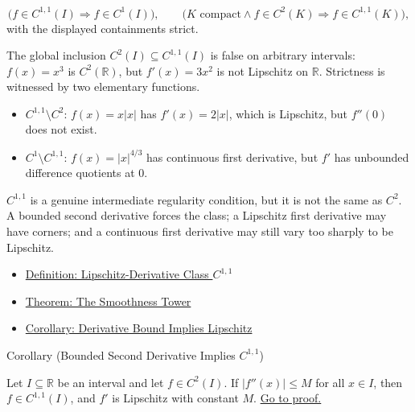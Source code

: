 \begin{remark*}
\[
  \bigl(f\in C^{1,1}(I)\Rightarrow f\in C^1(I)\bigr),
  \qquad
  \bigl(K\text{ compact}\land f\in C^2(K)\Rightarrow f\in C^{1,1}(K)\bigr),
\]
with the displayed containments strict.
\end{remark*}

\begin{remark*}
The global inclusion \(C^2(I)\subseteq C^{1,1}(I)\) is false on arbitrary
intervals: \(f(x)=x^3\) is \(C^2(\mathbb{R})\), but
\(f'(x)=3x^2\) is not Lipschitz on \(\mathbb{R}\). Strictness is witnessed by
two elementary functions.
\begin{itemize}
  \item \(C^{1,1}\setminus C^2\): \(f(x)=x|x|\) has \(f'(x)=2|x|\), which is
        Lipschitz, but \(f''(0)\) does not exist.
  \item \(C^1\setminus C^{1,1}\): \(f(x)=|x|^{4/3}\) has continuous first
        derivative, but \(f'\) has unbounded difference quotients at \(0\).
\end{itemize}
\end{remark*}

\begin{remark*}[Interpretation]
\(C^{1,1}\) is a genuine intermediate regularity condition, but it is not
the same as \(C^2\). A bounded second derivative forces the class; a
Lipschitz first derivative may have corners; and a continuous first
derivative may still vary too sharply to be Lipschitz.
\end{remark*}

\begin{dependencies}
\begin{itemize}
  \item \hyperref[def:class-c11]{Definition: Lipschitz-Derivative Class \(C^{1,1}\)}
  \item \hyperref[thm:smoothness-tower]{Theorem: The Smoothness Tower}
  \item \hyperref[cor:derivative-bound-implies-lipschitz]{Corollary: Derivative Bound Implies Lipschitz}
\end{itemize}
\end{dependencies}



\begin{corollarybox}{Corollary (Bounded Second Derivative Implies \(C^{1,1}\))}
\begin{corollary}
\label{cor:bounded-second-derivative-implies-c11}
Let \(I\subseteq\mathbb{R}\) be an interval and let \(f\in C^2(I)\). If
\(|f''(x)|\leq M\) for all \(x\in I\), then \(f\in C^{1,1}(I)\), and \(f'\)
is Lipschitz with constant \(M\).
\hyperref[prf:bounded-second-derivative-implies-c11]{Go to proof.}
\end{corollary}
\end{corollarybox}

